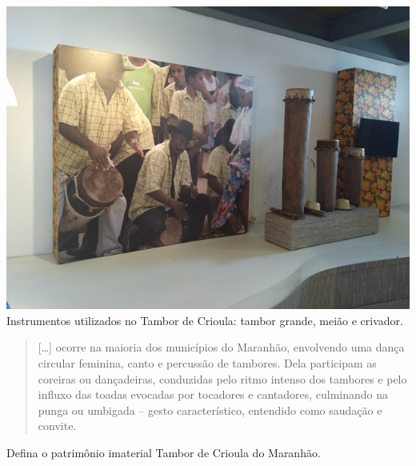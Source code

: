 \begin{minipage}{.5\textwidth}
\includegraphics[width=\textwidth]{./imgs/art29.png}
Instrumentos utilizados no Tambor de Crioula: tambor grande, meião e crivador.
\end{minipage}\hspace{.5cm}
\begin{minipage}{.5\textwidth}
\begin{quote}
{[}\ldots{}{]} ocorre na maioria dos municípios do
Maranhão, envolvendo uma dança circular feminina, canto e percussão de
tambores. Dela participam as coreiras ou dançadeiras, conduzidas pelo
ritmo intenso dos tambores e pelo influxo das toadas evocadas por
tocadores e cantadores, culminando na punga ou umbigada – gesto
característico, entendido como saudação e convite.

\end{quote}
\end{minipage}\bigskip\bigskip

Defina o patrimônio imaterial Tambor de Crioula do Maranhão.




